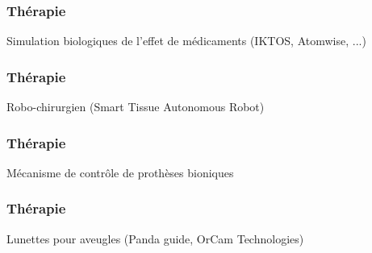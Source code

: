 \begin{frame}
  \frametitle{Thérapie}
  \begin{minipage}[c]{0.49\linewidth}
    Simulation biologiques de l'effet de médicaments (IKTOS, Atomwise, ...)
  \end{minipage}\hfill
  \begin{minipage}[c]{0.49\linewidth}
  \end{minipage}\hfill
\end{frame}

\begin{frame}
  \frametitle{Thérapie}
  Robo-chirurgien (Smart Tissue Autonomous Robot)
\end{frame}

\begin{frame}
  \frametitle{Thérapie}
  Mécanisme de contrôle de prothèses bioniques
\end{frame}

\begin{frame}
  \frametitle{Thérapie}
  Lunettes pour aveugles (Panda guide, OrCam Technologies)
\end{frame}
